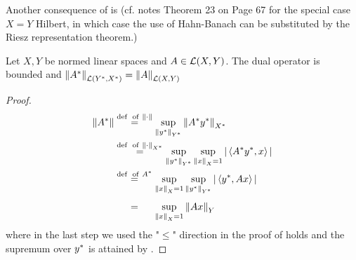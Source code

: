 \documentclass{article}
\begin{document}
Another consequence of  is (cf. notes Theorem 23 on Page 67 for the special case $X=Y$ Hilbert, in which case the use of Hahn-Banach can be substituted by the Riesz representation theorem.)

\begin{theorem}
Let $X,Y$ be normed linear spaces and $A \in \mathcal{L}({X},{Y})$. The dual operator  is bounded and $\left\|{{A}^*}\right\|_{\mathcal{L}({{Y}^*},{{X}^*})}=\left\|{A}\right\|_{\mathcal{L}({X},{Y})}$
\end{theorem}  

\begin{proof}
\begin{align*}
    \norm{\dual{A}} &\stackrel{\textrm{def \ of} \ \norm{\cdot}}{=} \sup_{\norm{\dual{y}}_{\dual{Y}}} \norm{\dual{A} \dual{y}}_{\dual{X}} \\
    &\stackrel{\textrm{def \ of} \  \norm{\cdot}_{\dual{X}}}{=} \sup_{\norm{\dual{y}}_{\dual{Y}}} \sup_{\norm{x}_X=1} |\inne{\dual{A}\dual{y}}{x}| \\
    &\stackrel{\textrm{def \ of} \ \dual{A}}{=} \sup_{\norm{x}_X=1}  \sup_{\norm{\dual{y}}_{\dual{Y}}}  |\inne{\dual{y}}{Ax}| \\
    &\stackrel{\phantom{\textrm{def \ of} \ \dual{A}}}{=} \sup_{\norm{x}_X=1} \norm{Ax}_Y
\end{align*}
where in the last step we used the "$\leq$" direction in the proof of  holds and the supremum over ${y}^*$ is attained by .  
\end{proof}
\end{document}
